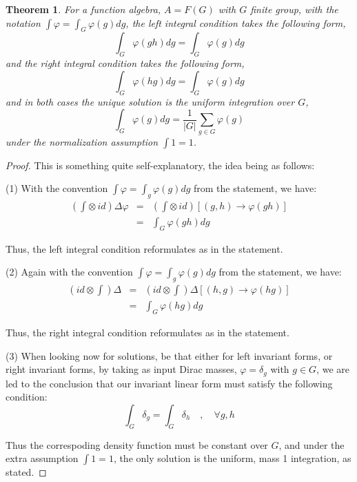\documentclass[12pt]{amsbook}
\newtheorem{theorem}{Theorem}[chapter]
\begin{document}
\begin{theorem}
For a function algebra, $A=F(G)$ with $G$ finite group, with the notation $\int\varphi=\int_G\varphi(g)dg$, the left integral condition takes the following form,
$$\int_G\varphi(gh)dg=\int_G\varphi(g)dg$$
and the right integral condition takes the following form,
$$\int_G\varphi(hg)dg=\int_G\varphi(g)dg$$
and in both cases the unique solution is the uniform integration over $G$,
$$\int_G\varphi(g)dg=\frac{1}{|G|}\sum_{g\in G}\varphi(g)$$
under the normalization assumption $\int 1=1$.
\end{theorem}

\begin{proof}
This is something quite self-explanatory, the idea being as follows:

\medskip

(1) With the convention $\int\varphi=\int_g\varphi(g)dg$ from the statement, we have:
\begin{eqnarray*}
\left(\int\otimes\,id\right)\Delta\varphi
&=&\left(\int\otimes\,id\right)\left[(g,h)\to\varphi(gh)\right]\\
&=&\int_G\varphi(gh)dg
\end{eqnarray*}

Thus, the left integral condition reformulates as in the statement.

\medskip

(2) Again with the convention $\int\varphi=\int_g\varphi(g)dg$ from the statement, we have:
\begin{eqnarray*}
\left(id\otimes\int\right)\Delta
&=&\left(id\otimes\int\right)\Delta\left[(h,g)\to\varphi(hg)\right]\\
&=&\int_G\varphi(hg)dg
\end{eqnarray*}

Thus, the right integral condition reformulates as in the statement.

\medskip

(3) When looking now for solutions, be that either for left invariant forms, or right invariant forms, by taking as input Dirac masses, $\varphi=\delta_g$ with $g\in G$, we are led to the conclusion that our invariant linear form must satisfy the following condition:
$$\int_G\delta_g=\int_G\delta_h\quad,\quad\forall g,h$$

Thus the correspoding density function must be constant over $G$, and under the extra assumption $\int 1=1$, the only solution is the uniform, mass 1 integration, as stated.
\end{proof}
\end{document}
